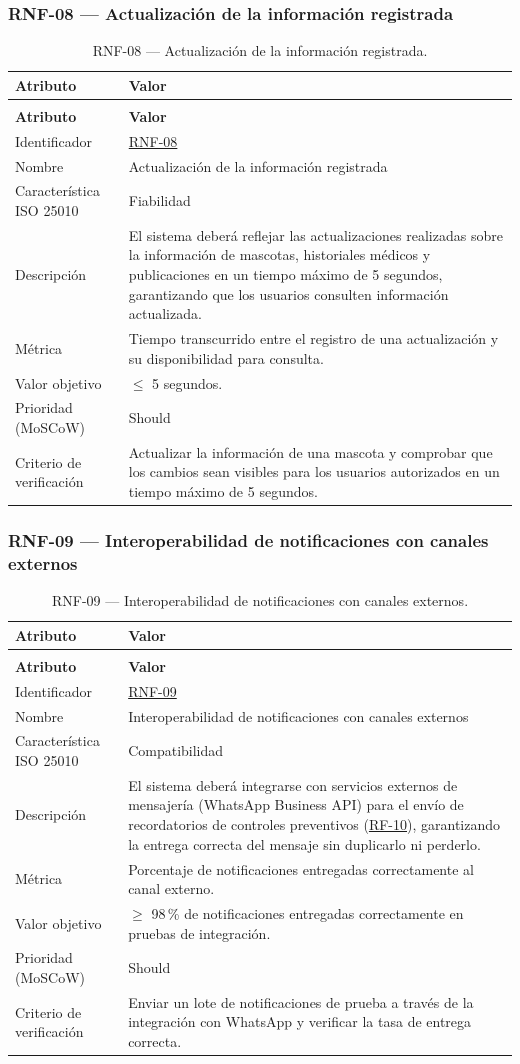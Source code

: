 \documentclass[journal,onecolumn]{IEEEtran}
\makeatletter
\newenvironment{atributos}[2]{%
	\small
	\begin{longtable}{@{}>{\raggedright\arraybackslash}p{4.2cm} >{\raggedright\arraybackslash}p{11.2cm}@{}}
		\caption{#2}\label{tab:#1}\\
		\toprule
		\textbf{Atributo} & \textbf{Valor} \\
		\midrule
		\endfirsthead
		\multicolumn{2}{@{}l}{\small\itshape (continuación)}\\
		\toprule
		\textbf{Atributo} & \textbf{Valor} \\
		\midrule
		\endhead
		\bottomrule
		\endlastfoot
	}{%
	\end{longtable}
	\normalsize
}
\makeatother
\begin{document}
	\subsubsection{RNF-08 --- Actualización de la información registrada}
	
	\begin{atributos}{RNF-08}{RNF-08 --- Actualización de la información registrada.}
		Identificador & \hyperref[tab:RNF-08]{RNF-08} \\
		Nombre & Actualización de la información registrada \\
		Característica ISO 25010 & Fiabilidad \\
		Descripción & El sistema deberá reflejar las actualizaciones realizadas sobre la información de mascotas, historiales médicos y publicaciones en un tiempo máximo de 5 segundos, garantizando que los usuarios consulten información actualizada. \\
		Métrica & Tiempo transcurrido entre el registro de una actualización y su disponibilidad para consulta. \\
		Valor objetivo & $\leq$ 5 segundos. \\
		Prioridad (MoSCoW) & Should \\
		Criterio de verificación & Actualizar la información de una mascota y comprobar que los cambios sean visibles para los usuarios autorizados en un tiempo máximo de 5 segundos. \\
	\end{atributos}
	
	\subsubsection{RNF-09 --- Interoperabilidad de notificaciones con canales externos}
	
	\begin{atributos}{RNF-09}{RNF-09 --- Interoperabilidad de notificaciones con canales externos.}
		Identificador & \hyperref[tab:RNF-09]{RNF-09} \\
		Nombre & Interoperabilidad de notificaciones con canales externos \\
		Característica ISO 25010 & Compatibilidad \\
		Descripción & El sistema deberá integrarse con servicios externos de mensajería (WhatsApp Business API) para el envío de recordatorios de controles preventivos (\hyperref[tab:RF-10]{RF-10}), garantizando la entrega correcta del mensaje sin duplicarlo ni perderlo. \\
		Métrica & Porcentaje de notificaciones entregadas correctamente al canal externo. \\
		Valor objetivo & $\geq$ 98\,\% de notificaciones entregadas correctamente en pruebas de integración. \\
		Prioridad (MoSCoW) & Should \\
		Criterio de verificación & Enviar un lote de notificaciones de prueba a través de la integración con WhatsApp y verificar la tasa de entrega correcta. \\
	\end{atributos}
	
\end{document}
